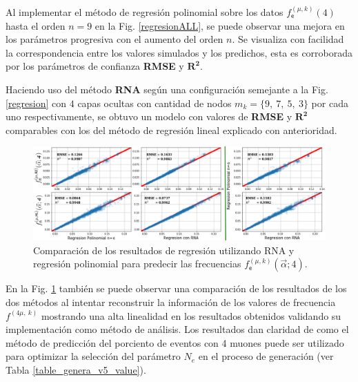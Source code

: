 Al implementar el método de regresión polinomial sobre los datos 
$f^{(\mu, k)}_\textsf{e} (4)$ 
hasta el orden $n = 9$ en la Fig. \ref{regresionALL}, se puede observar una mejora en los parámetros progresiva con el aumento del orden $n$. Se visualiza con facilidad la correspondencia entre los valores simulados y los predichos, esta es corroborada por los parámetros de confianza \textbf{RMSE} y $\mathbf{R^2}$. 

Haciendo uso del método \textbf{RNA} según una configuración semejante a la Fig. \ref{regresion} con $4$ capas ocultas con cantidad de nodos $m_k=\{9,~7,~5,~3\}$ por cada uno respectivamente, se obtuvo un modelo con valores de \textbf{RMSE} y $\mathbf{R^2}$ comparables con los del método de regresión lineal explicado con anterioridad.

\begin{figure}[!ht]
\centering
\includegraphics[width=1\textwidth]{Simulacion/imagenes/ML_Entries.png}
\caption{Comparación de los resultados de regresión utilizando RNA y regresión polinomial para predecir las frecuencias $f^{(\mu, k)}_\textsf{e} (\vec{\alpha}; 4)$.}
\label{regresionALL1}
\end{figure}

En la Fig. \ref{regresionALL1} también se puede observar una comparación de los resultados de los dos métodos al intentar reconstruir la información de los valores de frecuencia $f^{(4\mu,~k)}$ mostrando una alta linealidad en los resultados obtenidos validando su implementación como método de análisis. Los resultados dan claridad de como el método de predicción del porciento de eventos con 4 muones puede ser utilizado para optimizar la selección del parámetro $N_e$ en el proceso de generación (ver Tabla \ref{table_genera_v5_value}).


